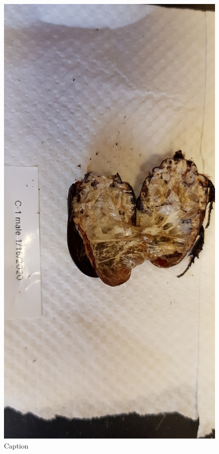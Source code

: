 
\begin{figure}[]
\centering
\includegraphics[width=\textwidth]{pm-images/20200116_110145_001.jpg}
\caption{Caption}
\end{figure}

